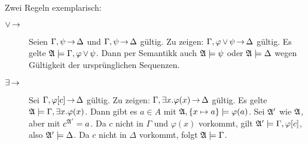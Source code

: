 Zwei Regeln exemplarisch:

\begin{description}
  \item[$\operatorname{\vee}\operatorname{\rightarrow}$]
  Seien $\Gamma,\psi\operatorname{\rightarrow}\Delta$ und $\Gamma,\psi\operatorname{\rightarrow}\Delta$ gültig.
  Zu zeigen: $\Gamma,\varphi\operatorname{\vee}\psi\operatorname{\rightarrow}\Delta$ gültig. Es gelte $\mathfrak{A}\models\Gamma,\varphi\operatorname{\vee}\psi$.
  Dann per Semantikk auch $\mathfrak{A}\models\psi$ oder $\mathfrak{A}\models\Delta$ wegen Gültigkeit der
  ursprünglichen Sequenzen.
  
  \item[$\exists\operatorname{\rightarrow}$]
  Sei $\Gamma,\varphi[c]\operatorname{\rightarrow}\Delta$ gültig. Zu zeigen: $\Gamma,\exists x.\varphi(x)\operatorname{\rightarrow}\Delta$ gültig.
  Es gelte $\mathfrak{A}\models\Gamma,\exists x.\varphi(x)$. Dann gibt es $a\in A$ mit $\mathfrak{A},\left\{x\mapsto a\right\}\models\varphi(a)$.
  Sei $\mathfrak{A}'$ wie $\mathfrak{A}$, aber mit $c^{\mathfrak{A}'}=a$. Da $c$ nicht in $\Gamma$ und $\varphi(x)$ vorkommt,
  gilt $\mathfrak{A}'\models\Gamma,\varphi[c]$, also $\mathfrak{A}'\models\Delta$. Da $c$ nicht in $\Delta$ vorkommt,
  folgt $\mathfrak{A}\models\Gamma$.
\end{description}


